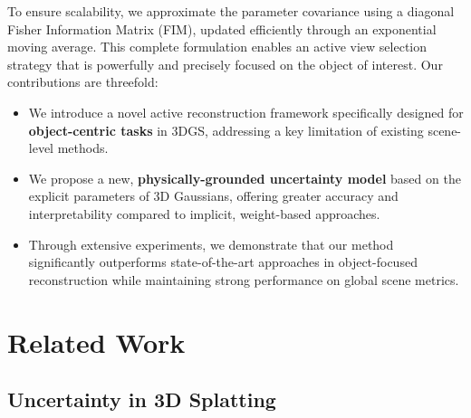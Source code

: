 \documentclass{egpubl}
\begin{document}
To ensure scalability, we approximate the parameter covariance using a diagonal Fisher Information Matrix (FIM), updated efficiently through an exponential moving average. This complete formulation enables an active view selection strategy that is powerfully and precisely focused on the object of interest. Our contributions are threefold:
    \begin{itemize}
        \item We introduce a novel active reconstruction framework specifically designed for \textbf{object-centric tasks} in 3DGS, addressing a key limitation of existing scene-level methods.
        \item We propose a new, \textbf{physically-grounded uncertainty model} based on the explicit parameters of 3D Gaussians, offering greater accuracy and interpretability compared to implicit, weight-based approaches.
        \item Through extensive experiments, we demonstrate that our method significantly outperforms state-of-the-art approaches in object-focused reconstruction while maintaining strong performance on global scene metrics.
    \end{itemize}

\vspace{-2mm}
\section{Related Work}
\subsection{Uncertainty in 3D Splatting}
\label{sec:related-3dgs}
\end{document}
